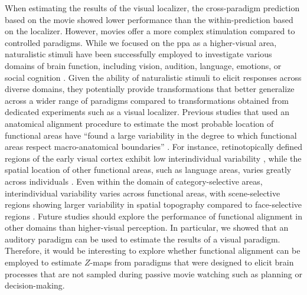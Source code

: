 
%
When estimating the results of the visual localizer, the cross-paradigm
prediction based on the movie showed lower performance than the
within-prediction based on the localizer.
%
However, movies offer a more complex stimulation compared to controlled
paradigms.
%
While we focused on the \ac{ppa} as a higher-visual area, naturalistic stimuli
have been successfully employed to investigate various domains of brain
function, including vision, audition, language, emotions, or social cognition
\citep[s.][for a review]{jaaskelainen2021movies}.
%
Given the ability of naturalistic stimuli to elicit responses across diverse
domains, they potentially provide transformations that better generalize across
a wider range of paradigms compared to transformations obtained from dedicated
experiments such as a visual localizer.
%
Previous studies that used an anatomical alignment procedure to estimate the
most probable location of functional areas have ``found a large variability in
the degree to which functional areas respect macro-anatomical boundaries''
\citep[][p. 1369]{frost2012measuring}.
%
For instance, retinotopically defined regions of the early visual cortex exhibit
low interindividual variability \citep{rosenke2021probabilistic}, while the
spatial location of other functional areas, such as language areas, varies
greatly across individuals \citep{frost2012measuring}.
%
Even within the domain of category-selective areas, interindividual variability
varies across functional areas, with scene-selective regions showing larger
variability in spatial topography compared to face-selective regions
\citep{zhen2015quantifying, zhen2017quantifying, frost2012measuring}.
%
Future studies should explore the performance of functional alignment in other
domains than higher-visual perception.
%
In particular, we showed that an auditory paradigm can be used to estimate the
results of a visual paradigm.
%
Therefore, it would be interesting to explore whether functional alignment can
be employed to estimate $Z$-maps from paradigms that were designed to elicit
brain processes that are not sampled during passive movie watching such as
planning or decision-making.

